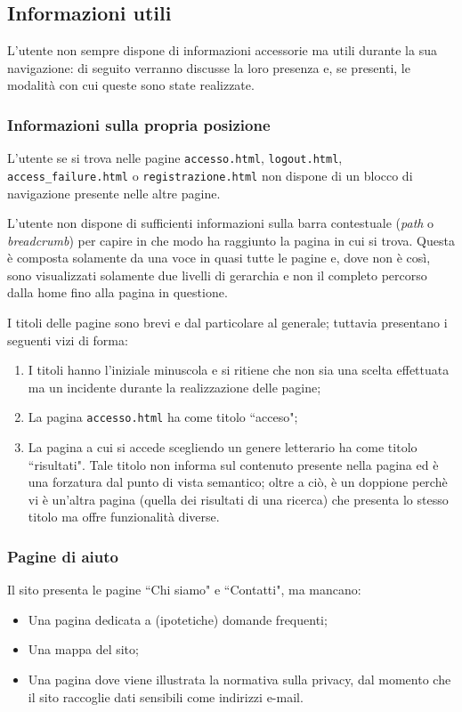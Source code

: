 \subsection{Informazioni utili}
L'utente non sempre dispone di informazioni accessorie ma utili durante la sua
navigazione: di seguito verranno discusse la loro presenza e, se presenti, le
modalità con cui queste sono state realizzate.

\subsubsection{Informazioni sulla propria posizione}\label{sec:user-posiz}
L'utente se si trova nelle pagine \texttt{accesso.html}, \texttt{logout.html},
\texttt{access\_failure.html} o \texttt{registrazione.html} non dispone di un
blocco di navigazione presente nelle altre pagine.

L'utente non dispone di sufficienti informazioni sulla barra contestuale
(\textit{path} o \textit{breadcrumb}) per capire in che modo ha raggiunto la
pagina in cui si trova. Questa è composta solamente da una voce in quasi tutte
le pagine e, dove non è così, sono visualizzati solamente due livelli di
gerarchia e non il completo percorso dalla home fino alla pagina in questione.

I titoli delle pagine sono brevi e dal particolare al generale; tuttavia
presentano i seguenti vizi di forma:
\begin{enumerate}
\item I titoli hanno l'iniziale minuscola e si ritiene che non sia una scelta
effettuata ma un incidente durante la realizzazione delle pagine;
\item La pagina \texttt{accesso.html} ha come titolo ``acceso";
\item La pagina a cui si accede scegliendo un genere letterario ha come titolo
``risultati". Tale titolo non informa sul contenuto presente nella pagina ed è
una forzatura dal punto di vista semantico; oltre a ciò, è un doppione perchè
vi è un'altra pagina (quella dei risultati di una ricerca) che presenta lo
stesso titolo ma offre funzionalità diverse.
\end{enumerate}

\subsubsection{Pagine di aiuto}
Il sito presenta le pagine ``Chi siamo" e ``Contatti", ma mancano:
\begin{itemize}
\item Una pagina dedicata a (ipotetiche) domande frequenti;
\item Una mappa del sito;
\item Una pagina dove viene illustrata la normativa sulla privacy, dal momento
che il sito raccoglie dati sensibili come indirizzi e-mail.
\end{itemize}

